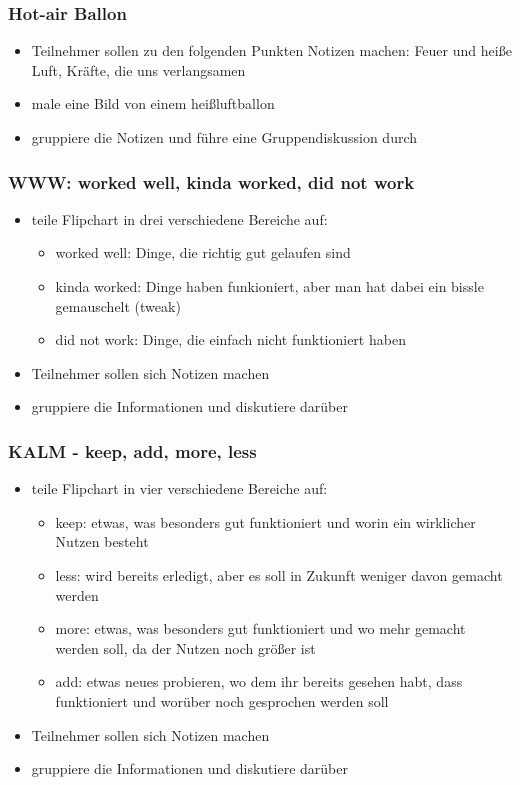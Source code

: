 \subsubsection{Hot-air Ballon}
\begin{itemize}
  \item Teilnehmer sollen zu den folgenden Punkten Notizen machen: Feuer und heiße Luft, Kräfte,
    die uns verlangsamen
  \item male eine Bild von einem heißluftballon
  \item gruppiere die Notizen und führe eine Gruppendiskussion durch
\end{itemize}


\subsubsection{WWW: worked well, kinda worked, did not work}
\begin{itemize}
  \item teile Flipchart in drei verschiedene Bereiche auf:
    \begin{itemize}
      \item worked well: Dinge, die richtig gut gelaufen sind
      \item kinda worked: Dinge haben funkioniert, aber man hat dabei ein bissle
        gemauschelt (tweak)
      \item did not work: Dinge, die einfach nicht funktioniert haben
    \end{itemize}
  \item Teilnehmer sollen sich Notizen machen
  \item gruppiere die Informationen und diskutiere
    darüber
\end{itemize}

\subsubsection{KALM - keep, add, more, less}
\begin{itemize}
  \item teile Flipchart in vier verschiedene Bereiche auf:
    \begin{itemize}
      \item keep: etwas, was besonders gut funktioniert und worin ein wirklicher Nutzen
        besteht
      \item less: wird bereits erledigt, aber es soll in Zukunft weniger davon
        gemacht werden
      \item more: etwas, was besonders gut funktioniert und wo mehr
        gemacht werden soll, da der Nutzen noch größer ist
      \item add: etwas neues probieren, wo dem ihr bereits
        gesehen habt, dass funktioniert und worüber noch
        gesprochen werden soll
    \end{itemize}
  \item Teilnehmer sollen sich Notizen machen
  \item gruppiere die Informationen und
    diskutiere darüber
\end{itemize}



